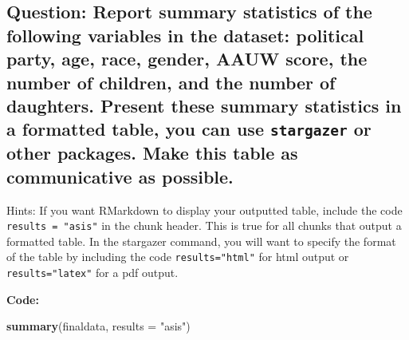 \documentclass[
]{article}
\newenvironment{Shaded}{\begin{snugshade}}{\end{snugshade}}
\newcommand{\AttributeTok}[1]{\textcolor[rgb]{0.13,0.29,0.53}{#1}}
\newcommand{\FunctionTok}[1]{\textcolor[rgb]{0.13,0.29,0.53}{\textbf{#1}}}
\newcommand{\NormalTok}[1]{#1}
\newcommand{\StringTok}[1]{\textcolor[rgb]{0.31,0.60,0.02}{#1}}
\begin{document}
\hypertarget{question-report-summary-statistics-of-the-following-variables-in-the-dataset-political-party-age-race-gender-aauw-score-the-number-of-children-and-the-number-of-daughters.-present-these-summary-statistics-in-a-formatted-table-you-can-use-stargazer-or-other-packages.-make-this-table-as-communicative-as-possible.}{%
\subsection{\texorpdfstring{Question: Report summary statistics of the
following variables in the dataset: political party, age, race, gender,
AAUW score, the number of children, and the number of daughters. Present
these summary statistics in a formatted table, you can use
\texttt{stargazer} or other packages. Make this table as communicative
as
possible.}{Question: Report summary statistics of the following variables in the dataset: political party, age, race, gender, AAUW score, the number of children, and the number of daughters. Present these summary statistics in a formatted table, you can use stargazer or other packages. Make this table as communicative as possible.}}\label{question-report-summary-statistics-of-the-following-variables-in-the-dataset-political-party-age-race-gender-aauw-score-the-number-of-children-and-the-number-of-daughters.-present-these-summary-statistics-in-a-formatted-table-you-can-use-stargazer-or-other-packages.-make-this-table-as-communicative-as-possible.}}

Hints: If you want RMarkdown to display your outputted table, include
the code \texttt{results\ =\ "asis"} in the chunk header. This is true
for all chunks that output a formatted table. In the stargazer command,
you will want to specify the format of the table by including the code
\texttt{results="html"} for html output or \texttt{results="latex"} for
a pdf output.

\textbf{Code:}

\begin{Shaded}
\begin{Highlighting}[]
\FunctionTok{summary}\NormalTok{(finaldata, }\AttributeTok{results =} \StringTok{"asis"}\NormalTok{)}
\end{Highlighting}
\end{Shaded}
\end{document}
